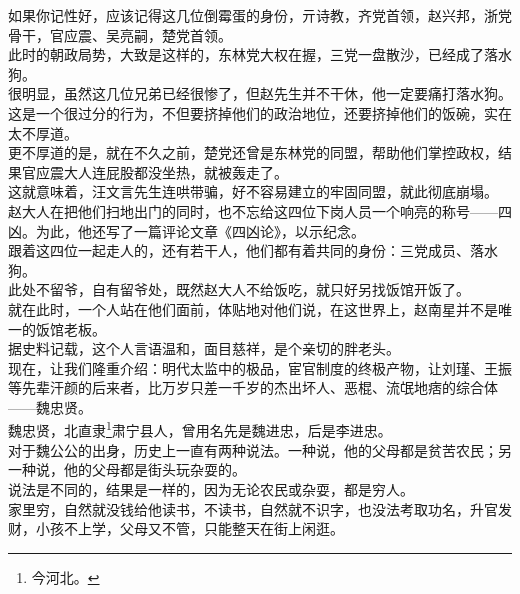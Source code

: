 \begin{multicols}{\theparacolNo}
如果你记性好，应该记得这几位倒霉蛋的身份，亓诗教，齐党首领，赵兴邦，浙党骨干，官应震、吴亮嗣，楚党首领。\\

此时的朝政局势，大致是这样的，东林党大权在握，三党一盘散沙，已经成了落水狗。\\

很明显，虽然这几位兄弟已经很惨了，但赵先生并不干休，他一定要痛打落水狗。\\

这是一个很过分的行为，不但要挤掉他们的政治地位，还要挤掉他们的饭碗，实在太不厚道。\\

更不厚道的是，就在不久之前，楚党还曾是东林党的同盟，帮助他们掌控政权，结果官应震大人连屁股都没坐热，就被轰走了。\\

这就意味着，汪文言先生连哄带骗，好不容易建立的牢固同盟，就此彻底崩塌。\\

赵大人在把他们扫地出门的同时，也不忘给这四位下岗人员一个响亮的称号——四凶。为此，他还写了一篇评论文章《四凶论》，以示纪念。\\

跟着这四位一起走人的，还有若干人，他们都有着共同的身份：三党成员、落水狗。\\

此处不留爷，自有留爷处，既然赵大人不给饭吃，就只好另找饭馆开饭了。\\

就在此时，一个人站在他们面前，体贴地对他们说，在这世界上，赵南星并不是唯一的饭馆老板。\\

据史料记载，这个人言语温和，面目慈祥，是个亲切的胖老头。\\

现在，让我们隆重介绍：明代太监中的极品，宦官制度的终极产物，让刘瑾、王振等先辈汗颜的后来者，比万岁只差一千岁的杰出坏人、恶棍、流氓地痞的综合体——魏忠贤。\\

魏忠贤，北直隶\footnote{今河北。}肃宁县人，曾用名先是魏进忠，后是李进忠。\\

对于魏公公的出身，历史上一直有两种说法。一种说，他的父母都是贫苦农民；另一种说，他的父母都是街头玩杂耍的。\\

说法是不同的，结果是一样的，因为无论农民或杂耍，都是穷人。\\

家里穷，自然就没钱给他读书，不读书，自然就不识字，也没法考取功名，升官发财，小孩不上学，父母又不管，只能整天在街上闲逛。\\


\end{multicols}
